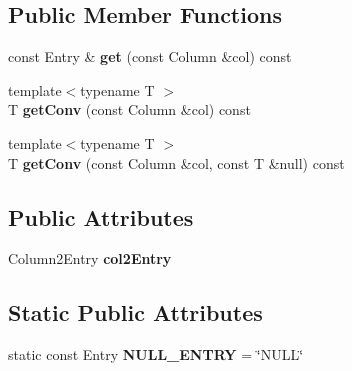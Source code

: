 \subsection*{Public Member Functions}
\begin{DoxyCompactItemize}
\item 
\hypertarget{structsambag_1_1cpsqlite_1_1_data_base_1_1_result_a42eaa8175a01058489f935cadadb2f72}{
const Entry \& {\bfseries get} (const Column \&col) const }
\label{structsambag_1_1cpsqlite_1_1_data_base_1_1_result_a42eaa8175a01058489f935cadadb2f72}

\item 
\hypertarget{structsambag_1_1cpsqlite_1_1_data_base_1_1_result_a4d2c9e0223d602820631b6a3d5170b58}{
{\footnotesize template$<$typename T $>$ }\\T {\bfseries getConv} (const Column \&col) const }
\label{structsambag_1_1cpsqlite_1_1_data_base_1_1_result_a4d2c9e0223d602820631b6a3d5170b58}

\item 
\hypertarget{structsambag_1_1cpsqlite_1_1_data_base_1_1_result_abed1428aefd0e911d4c051002b414363}{
{\footnotesize template$<$typename T $>$ }\\T {\bfseries getConv} (const Column \&col, const T \&null) const }
\label{structsambag_1_1cpsqlite_1_1_data_base_1_1_result_abed1428aefd0e911d4c051002b414363}

\end{DoxyCompactItemize}
\subsection*{Public Attributes}
\begin{DoxyCompactItemize}
\item 
\hypertarget{structsambag_1_1cpsqlite_1_1_data_base_1_1_result_a24038560f824afe4fdb404935682b393}{
Column2Entry {\bfseries col2Entry}}
\label{structsambag_1_1cpsqlite_1_1_data_base_1_1_result_a24038560f824afe4fdb404935682b393}

\end{DoxyCompactItemize}
\subsection*{Static Public Attributes}
\begin{DoxyCompactItemize}
\item 
\hypertarget{structsambag_1_1cpsqlite_1_1_data_base_1_1_result_a8c055272d29a6b3d290d59163e50f798}{
static const Entry {\bfseries NULL\_\-ENTRY} = \char`\"{}NULL\char`\"{}}
\label{structsambag_1_1cpsqlite_1_1_data_base_1_1_result_a8c055272d29a6b3d290d59163e50f798}

\end{DoxyCompactItemize}



